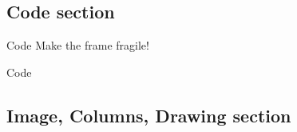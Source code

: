 \subsection{Code section}

\begin{frame}[fragile]{Code}
Make the frame fragile!

\end{frame}



\begin{frame}[fragile]{Code}

\end{frame}





\subsection{Image, Columns, Drawing section}
